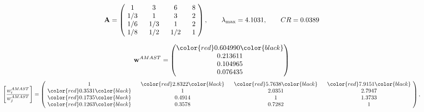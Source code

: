 \begin{example}
\begin{equation*}
\mathbf{A} =
\begin{pmatrix}
$\,\,$ 1 $\,\,$ & $\,\,$3$\,\,$ & $\,\,$6$\,\,$ & $\,\,$8 $\,\,$ \\
$\,\,$ 1/3$\,\,$ & $\,\,$ 1 $\,\,$ & $\,\,$3$\,\,$ & $\,\,$2 $\,\,$ \\
$\,\,$ 1/6$\,\,$ & $\,\,$ 1/3$\,\,$ & $\,\,$ 1 $\,\,$ & $\,\,$2 $\,\,$ \\
$\,\,$ 1/8$\,\,$ & $\,\,$ 1/2$\,\,$ & $\,\,$ 1/2$\,\,$ & $\,\,$ 1  $\,\,$ \\
\end{pmatrix},
\qquad
\lambda_{\max} =
4.1031,
\qquad
CR = 0.0389
\end{equation*}

\begin{equation*}
\mathbf{w}^{AMAST} =
\begin{pmatrix}
\color{red} 0.604990\color{black} \\
0.213611\\
0.104965\\
0.076435
\end{pmatrix}\end{equation*}
\begin{equation*}
\left[ \frac{{w}^{AMAST}_i}{{w}^{AMAST}_j} \right] =
\begin{pmatrix}
$\,\,$ 1 $\,\,$ & $\,\,$\color{red} 2.8322\color{black} $\,\,$ & $\,\,$\color{red} 5.7638\color{black} $\,\,$ & $\,\,$\color{red} 7.9151\color{black} $\,\,$ \\
$\,\,$\color{red} 0.3531\color{black} $\,\,$ & $\,\,$ 1 $\,\,$ & $\,\,$2.0351$\,\,$ & $\,\,$2.7947  $\,\,$ \\
$\,\,$\color{red} 0.1735\color{black} $\,\,$ & $\,\,$0.4914$\,\,$ & $\,\,$ 1 $\,\,$ & $\,\,$1.3733 $\,\,$ \\
$\,\,$\color{red} 0.1263\color{black} $\,\,$ & $\,\,$0.3578$\,\,$ & $\,\,$0.7282$\,\,$ & $\,\,$ 1  $\,\,$ \\
\end{pmatrix},
\end{equation*}


\end{example}
